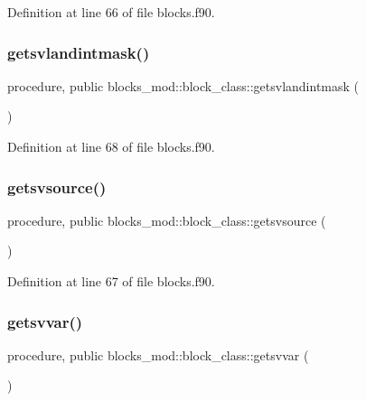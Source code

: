 Definition at line 66 of file blocks.\+f90.

\mbox{\label{structblocks__mod_1_1block__class_a953609bdf877e35ff4776a4f753d35c3}} 
\subsubsection{\texorpdfstring{getsvlandintmask()}{getsvlandintmask()}}
{\footnotesize\ttfamily procedure, public blocks\+\_\+mod\+::block\+\_\+class\+::getsvlandintmask (\begin{DoxyParamCaption}{ }\end{DoxyParamCaption})}



Definition at line 68 of file blocks.\+f90.

\mbox{\label{structblocks__mod_1_1block__class_aa94c1e7e359c2b943c711d85d4edee3c}} 
\subsubsection{\texorpdfstring{getsvsource()}{getsvsource()}}
{\footnotesize\ttfamily procedure, public blocks\+\_\+mod\+::block\+\_\+class\+::getsvsource (\begin{DoxyParamCaption}{ }\end{DoxyParamCaption})}



Definition at line 67 of file blocks.\+f90.

\mbox{\label{structblocks__mod_1_1block__class_a16587b020185447a1ff1c398e23ddd5e}} 
\subsubsection{\texorpdfstring{getsvvar()}{getsvvar()}}
{\footnotesize\ttfamily procedure, public blocks\+\_\+mod\+::block\+\_\+class\+::getsvvar (\begin{DoxyParamCaption}{ }\end{DoxyParamCaption})}



